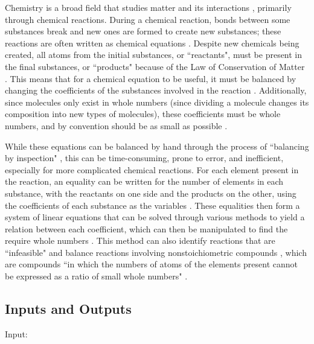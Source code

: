 \documentclass{article}
\begin{document}
Chemistry is a broad field that studies matter and its interactions
\cite{gordon_chm101_2023}, primarily through chemical reactions.
During a chemical reaction, bonds between some substances break and new ones are
formed to create new substances; these reactions are often written as chemical
equations \cite{lund_introduction_2023}. Despite new chemicals being created,
all atoms from the initial substances, or ``reactants", must be present in the
final substances, or ``products" because of the Law of Conservation of Matter
\cite{lund_introduction_2023}. This means that for a chemical equation to be
useful, it must be balanced by changing the coefficients of the substances
involved in the reaction \cite{lund_introduction_2023}. Additionally, since
molecules only exist in whole numbers (since dividing a molecule changes its
composition into new types of molecules), these coefficients must be whole
numbers, and by convention should be as small as possible
\cite{lund_introduction_2023}.

While these equations can be balanced by hand through the process of
``balancing by inspection" \cite{lund_introduction_2023}, this can be
time-consuming, prone
to error, and inefficient, especially for more complicated chemical reactions.
For each element present in the reaction, an equality can be written for the
number of elements in each substance, with the reactants on one side and the
products on the other, using the coefficients of each substance as the
variables \cite{hamid_balancing_2019}. These equalities then form a system of
linear
equations that can be solved through various methods to yield a relation
between each coefficient, which can then be manipulated to find the require
whole
numbers \cite{lund_introduction_2023, hamid_balancing_2019}. This method can
also identify reactions that are ``infeasible" and balance reactions involving
nonstoichiometric compounds \cite{hamid_balancing_2019}, which are compounds
``in which the numbers of atoms of the elements present cannot be expressed as a
ratio of small whole numbers"
\cite{the_editors_of_encyclopaedia_britannica_nonstoichiometric_2010}.

\subsection{Inputs and Outputs} \label{io}

\null\newline
\null\newline
\noindent Input:
\end{document}
